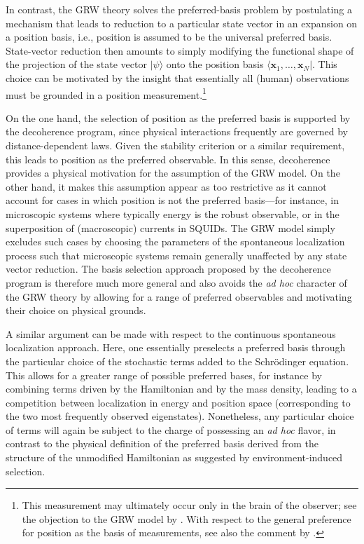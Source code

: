 \documentclass[twocolumn,rmp,aps,amsmath,amsfonts,noshowkeys,noshowpacs]{revtex4}
\newcommand{\ket}[1]{\ensuremath{|{#1\rangle}}}
\newcommand{\bra}[1]{\ensuremath{{\langle #1}|}}
\begin{document}
In contrast, the GRW theory solves the preferred-basis problem by
postulating a mechanism that leads to reduction to a particular state
vector in an expansion on a position basis, i.e., position is assumed
to be the universal preferred basis. State-vector reduction then
amounts to simply modifying the functional shape of the projection of
the state vector $\ket{\psi}$ onto the position basis
$\bra{\mathbf{x}_1, \hdots, \mathbf{x}_N}$.  This choice can be
motivated by the insight that essentially all (human) observations
must be grounded in a position measurement.\footnote{This measurement
  may ultimately occur only in the brain of the observer; see the
  objection to the GRW model by \citet{Albert:1989:ps}. With respect
  to the general preference for position as the basis of measurements,
  see also the comment by \citet{Bell:1982:ag}.}

On the one hand, the selection of position as the preferred basis is
supported by the decoherence program, since physical interactions
frequently are governed by distance-dependent laws. Given the
stability criterion or a similar requirement, this leads to position
as the preferred observable. In this sense, decoherence provides a
physical motivation for the assumption of the GRW model.  On the other
hand, it makes this assumption appear as too restrictive as it cannot
account for cases in which position is not the preferred basis---for
instance, in microscopic systems where typically energy is the robust
observable, or in the superposition of (macroscopic) currents in
SQUIDs. The GRW model simply excludes such cases by choosing the
parameters of the spontaneous localization process such that
microscopic systems remain generally unaffected by any state vector
reduction.  The basis selection approach proposed by the decoherence
program is therefore much more general and also avoids the \emph{ad
  hoc} character of the GRW theory by allowing for a range of
preferred observables and motivating their choice on physical grounds.

A similar argument can be made with respect to the continuous
spontaneous localization approach. Here, one essentially preselects a
preferred basis through the particular choice of the stochastic terms
added to the Schr\"odinger equation.  This allows for a greater range
of possible preferred bases, for instance by combining terms driven by
the Hamiltonian and by the mass density, leading to a competition
between localization in energy and position space (corresponding to
the two most frequently observed eigenstates).  Nonetheless, any
particular choice of terms will again be subject to the charge of
possessing an \emph{ad hoc} flavor, in contrast to the physical
definition of the preferred basis derived from the structure of the
unmodified Hamiltonian as suggested by environment-induced selection.
\end{document}
